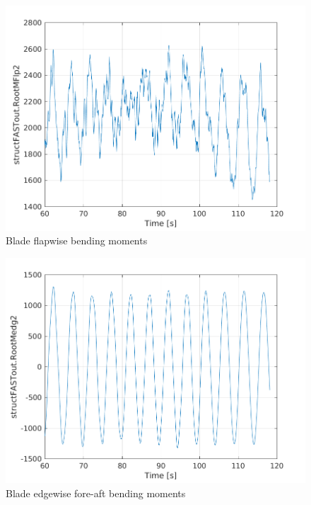 \documentclass[12pt,t]{beamer}
\begin{document}
\begin{frame}
\begin{figure}[H]
\begin{minipage}{0.38\textwidth}
\end{minipage}
\begin{minipage}{0.38\textwidth}
  \centering
  \includegraphics[width=1\linewidth]{../CIP_6/FAST/Plots_ws5/RootMFlp2.png} \\
     \tiny
      Blade flapwise bending moments
\end{minipage}
\begin{minipage}{0.38\textwidth}
  \centering
  \includegraphics[width=1\linewidth]{../CIP_6/FAST/Plots_ws5/RootMedg2.png} \\
     \tiny
      Blade edgewise fore-aft bending moments
\end{minipage}
\end{figure}
\end{frame}
\end{document}
